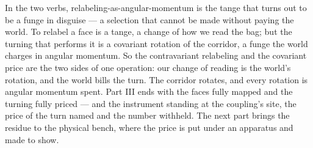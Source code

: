 In the two verbs, relabeling-as-angular-momentum is the tange that turns out to be a funge in disguise --- a selection that
cannot be made without paying the world. To relabel a face is a tange, a change of how we read the bag; but the turning that
performs it is a covariant rotation of the corridor, a funge the world charges in angular momentum. So the contravariant
relabeling and the covariant price are the two sides of one operation: our change of reading is the world's rotation, and the
world bills the turn. The corridor rotates, and every rotation is angular momentum spent. Part III ends with the faces fully
mapped and the turning fully priced --- and the instrument standing at the coupling's site, the price of the turn named and
the number withheld. The next part brings the residue to the physical bench, where the price is put under an apparatus and
made to show.
